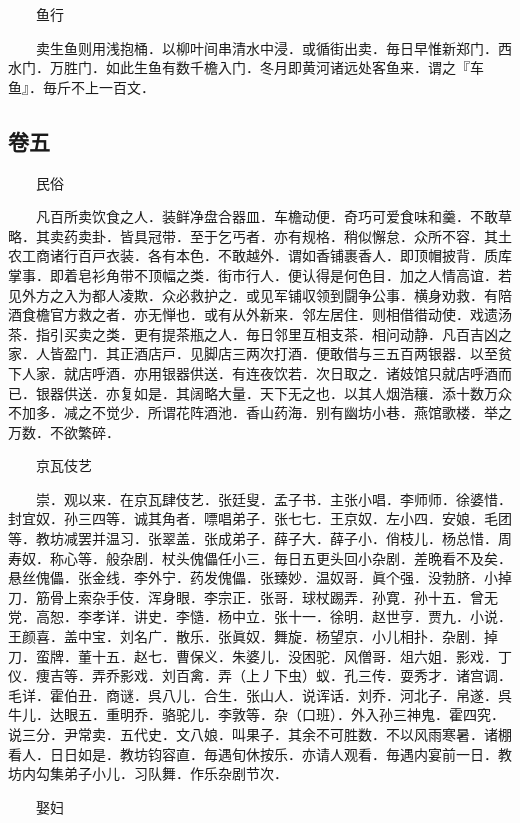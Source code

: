 　　鱼行

　　卖生鱼则用浅抱桶．以柳叶间串清水中浸．或循街出卖．毎日早惟新郑门．西水门．万胜门．如此生鱼有数千檐入门．冬月即黄河诸远处客鱼来．谓之『车鱼』．毎斤不上一百文．

\hypertarget{ux5377ux4e94}{%
\subsection{卷五}\label{ux5377ux4e94}}

　　民俗

　　凡百所卖饮食之人．装鲜净盘合器皿．车檐动便．奇巧可爱食味和羹．不敢草略．其卖药卖卦．皆具冠带．至于乞丐者．亦有规格．稍似懈怠．众所不容．其土农工商诸行百戸衣装．各有本色．不敢越外．谓如香铺裹香人．即顶帽披背．质库掌事．即着皂衫角带不顶幅之类．街市行人．便认得是何色目．加之人情高谊．若见外方之入为都人凌欺．众必救护之．或见军铺収领到闘争公事．横身劝救．有陪酒食檐官方救之者．亦无惮也．或有从外新来．邻左居住．则相借徣动使．戏遗汤茶．指引买卖之类．更有提茶瓶之人．毎日邻里互相支茶．相问动静．凡百吉凶之家．人皆盈门．其正酒店戸．见脚店三两次打酒．便敢借与三五百两银器．以至贫下人家．就店呼酒．亦用银器供送．有连夜饮若．次日取之．诸妓馆只就店呼酒而已．银器供送．亦复如是．其阔略大量．天下无之也．以其人烟浩穰．添十数万众不加多．减之不觉少．所谓花阵酒池．香山药海．别有幽坊小巷．燕馆歌楼．举之万数．不欲繁碎．

　　京瓦伎艺

　　崇．观以来．在京瓦肆伎艺．张廷叟．孟子书．主张小唱．李师师．徐婆惜．封宜奴．孙三四等．诚其角者．嘌唱弟子．张七七．王京奴．左小四．安娘．毛团等．教坊减罢并温习．张翠盖．张成弟子．薛子大．薛子小．俏枝儿．杨总惜．周寿奴．称心等．般杂剧．杖头傀儡任小三．毎日五更头回小杂剧．差晩看不及矣．悬丝傀儡．张金线．李外宁．药发傀儡．张臻妙．温奴哥．眞个强．没勃脐．小掉刀．筋骨上索杂手伎．浑身眼．李宗正．张哥．球杖踢弄．孙寛．孙十五．曾无党．高恕．李孝详．讲史．李慥．杨中立．张十一．徐明．赵世亨．贾九．小说．王颜喜．盖中宝．刘名广．散乐．张眞奴．舞旋．杨望京．小儿相扑．杂剧．掉刀．蛮牌．董十五．赵七．曹保义．朱婆儿．没困驼．风僧哥．俎六姐．影戏．丁仪．痩吉等．弄乔影戏．刘百禽．弄（上丿下虫）蚁．孔三传．耍秀才．诸宫调．毛详．霍伯丑．商谜．呉八儿．合生．张山人．说诨话．刘乔．河北子．帛遂．呉牛儿．达眼五．重明乔．骆驼儿．李敦等．杂（口班）．外入孙三神鬼．霍四究．说三分．尹常卖．五代史．文八娘．叫果子．其余不可胜数．不以风雨寒暑．诸棚看人．日日如是．教坊钧容直．毎遇旬休按乐．亦请人观看．毎遇内宴前一日．教坊内勾集弟子小儿．习队舞．作乐杂剧节次．

　　娶妇


